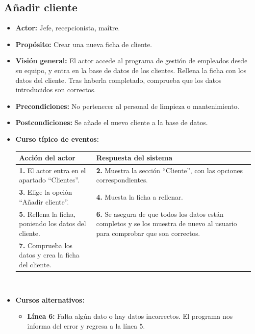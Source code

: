 \documentclass[spanish,a4paper,11pt, twoside]{report}	%
\begin{document}
	\subsection{Añadir cliente}
		
			\begin{itemize}
			\item \textbf{Actor:} Jefe, recepcionista, maître.
			\item \textbf{Propósito:} Crear una nueva ficha de cliente.
			\item \textbf{Visión general:} El actor accede al programa de gestión de empleados desde su equipo, y entra en la base de datos de los clientes. Rellena la ficha con los datos del cliente. Tras haberla completado, comprueba que los datos introducidos son correctos. 
			\item \textbf{Precondiciones:} No pertenecer al personal de limpieza o mantenimiento.
			\item \textbf{Postcondiciones:} Se añade el nuevo cliente a la base de datos.
			\item \textbf{Curso típico de eventos:} 	\\
				\begin{tabular}{|p{6cm}||p{6cm}|}
				\hline
				\textbf{Acción del actor} & \textbf{Respuesta del sistema} \\ \hline \hline
				\textbf{1.} El actor entra en el apartado ``Clientes''. & 
				\textbf{2.} Muestra la sección ``Cliente'', con las opciones correspondientes. \\ \hline
				\textbf{3.} Elige la opción ``Añadir cliente''.	& 
				\textbf{4.} Muesta la ficha a rellenar. \\ \hline
				\textbf{5.} Rellena la ficha, poniendo los datos del cliente. & 
				\textbf{6.} Se asegura de que todos los datos están completos y se 
					los muestra de nuevo al usuario para comprobar que son correctos.\\ \hline
				\textbf{7.} Comprueba los datos y crea la ficha del cliente. & \textbf{} \\ \hline
			\end{tabular}
			\\
			\item \textbf{Cursos alternativos:} 
			\begin{itemize}
				\item  \textbf{Línea 6:} Falta algún dato o hay datos incorrectos. El programa
					nos informa del error y regresa a la línea 5.
			\end {itemize}
		\end{itemize}
\end{document}
